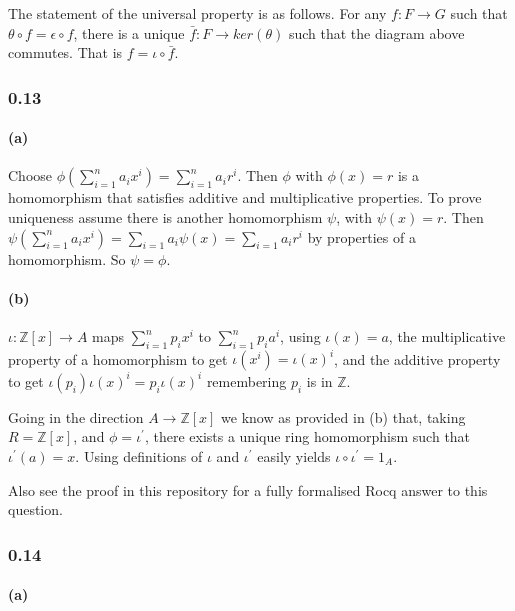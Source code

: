 \documentclass{article}
\begin{document}
The statement of the universal property is as follows. For any $f\colon F \rightarrow G$ such that $\theta \circ f = \epsilon \circ f$, there is a unique $\bar{f}\colon F \rightarrow ker(\theta)$ such that the diagram above commutes. That is $f = \iota \circ \bar{f}$. \\

\subsubsection*{0.13}
\paragraph{(a)}
Choose $\phi(\sum_{i=1}^na_ix^i) = \sum_{i=1}^na_ir^i$. Then $\phi$ with $\phi(x)=r$ is a homomorphism that
satisfies additive and multiplicative properties. To prove uniqueness assume there is another
homomorphism $\psi$, with $\psi(x)=r$. Then $\psi(\sum_{i=1}^na_ix^i) = \sum_{i=1}a_i\psi(x) = \sum_{i=1}a_ir^i$ by properties of
a homomorphism. So $\psi=\phi$. \par

\paragraph{(b)}
$\iota \colon \mathds{Z}[x] \rightarrow A$ maps
$\sum_{i=1}^n p_ix^i$ to $\sum_{i=1}^n p_ia^i$, using $\iota(x) = a$,
the multiplicative property of a homomorphism to get $\iota(x^i)=\iota(x)^i$,
and the additive property to get $\iota(p_i)\iota(x)^i = p_i\iota(x)^i$ remembering $p_i$ is in $\mathds{Z}$. \par

Going in the direction $A \rightarrow \mathds{Z}[x]$ we know as provided in (b) that,
taking $R=\mathds{Z}[x]$, and $\phi=\iota^\prime$, there exists a unique ring homomorphism such that $\iota^\prime(a)=x$.
Using definitions of $\iota$ and $\iota^\prime$ easily yields $\iota \circ \iota^\prime = 1_A$.

Also see the proof in this repository for a fully formalised Rocq answer to this question.

\subsubsection*{0.14}
\paragraph{(a)}
\end{document}
